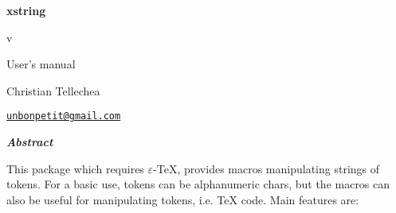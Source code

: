 \documentclass[a4paper,10pt]{article}
\begin{document}
\setlength{\parindent}{0pt}
\begin{titlepage}
	\null\par\vfill
	\begin{center}
		\begin{minipage}{0.75\linewidth}
			\begin{center}
				\Huge\bfseries xstring\par\vspace{5pt}
				\small v\xstringversion\par\vspace{25pt}
				\normalsize User's manual
			\end{center}
		\end{minipage}
	\end{center}
	\vspace{1cm}
	\begin{center}
		Christian {\sc Tellechea}\par\small
		\href{mailto:unbonpetit@gmail.com}{\nolinkurl{unbonpetit@gmail.com}}\par\vspace{5pt}
		\xstringenglishdate
	\end{center}
	\vfill\hrulefill
	\begin{center}
		\begin{minipage}{0.85\linewidth}
			\noindent
			\hfill\textbf{\textit{Abstract}}\hfill{}\medskip\par
			This package which requires $\varepsilon$-\TeX{}, provides macros manipulating strings of tokens. For a basic use, tokens can be alphanumeric chars, but the macros can also be useful for manipulating tokens, i.e. \TeX{} code. Main features are:\smallskip


\end{minipage}
\end{center}
\end{titlepage}
\end{document}
